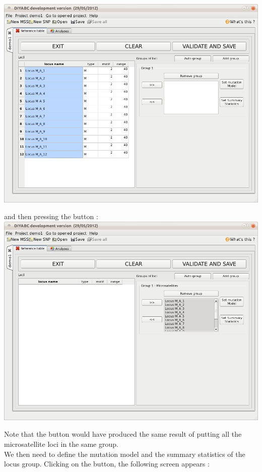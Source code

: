 \includegraphics[scale=0.35]{gui_pictures/Capture-DIYABC-17.png} 

and then pressing the \fbox{\textsf{$ >> $}} button : \\

\includegraphics[scale=0.35]{gui_pictures/Capture-DIYABC-18.png}

Note that the  button would have produced the same result of putting all the microsatellite loci in the same group.\\  

We then need to define the mutation model and the summary statistics of the locus group. Clicking on the  button, the following screen appears :\\

